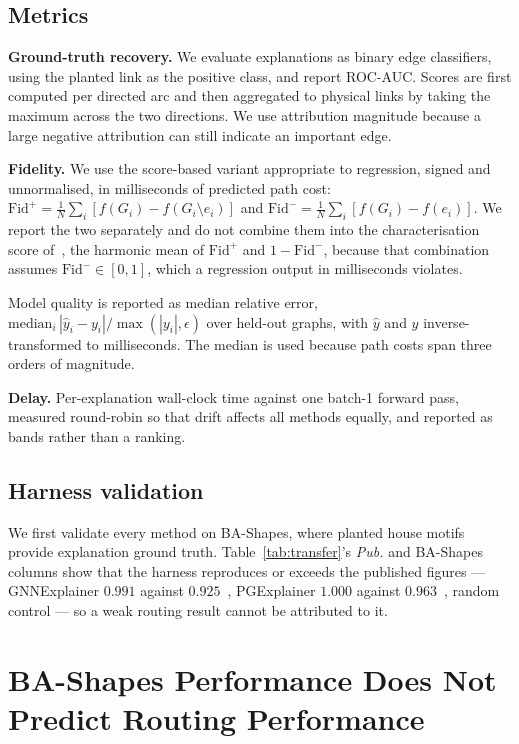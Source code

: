 \documentclass[conference]{IEEEtran}
\begin{document}
\subsection{Metrics}
\textbf{Ground-truth recovery.} We evaluate explanations as binary edge classifiers, using the planted link as the positive class, and report ROC-AUC. Scores are first computed per directed arc and then aggregated to physical links by taking the maximum across the two directions. We use attribution magnitude because a large negative attribution can still indicate an important edge.

\textbf{Fidelity.} We use the score-based variant appropriate to regression,
signed and unnormalised, in milliseconds of predicted path cost:
$\mathrm{Fid}^{+} = \frac{1}{N}\sum_i [f(G_i) - f(G_i \setminus e_i)]$ and
$\mathrm{Fid}^{-} = \frac{1}{N}\sum_i [f(G_i) - f(e_i)]$.
We report the two separately and do not combine them into the
characterisation score of~\cite{li2022survey}, the harmonic mean of
$\mathrm{Fid}^{+}$ and $1-\mathrm{Fid}^{-}$, because that combination assumes
$\mathrm{Fid}^{-}\!\in\![0,1]$, which a regression output in milliseconds
violates.

Model quality is reported as median relative error,
$\mathrm{median}_i\,|\hat{y}_i - y_i| / \max(|y_i|, \epsilon)$ over held-out
graphs, with $\hat{y}$ and $y$ inverse-transformed to milliseconds. The median
is used because path costs span three orders of magnitude.

\textbf{Delay.} Per-explanation wall-clock time against one batch-1 forward
pass, measured round-robin so that drift affects all methods equally, and
reported as bands rather than a ranking.

\subsection{Harness validation}
We first validate every method on BA-Shapes, where planted house motifs
provide explanation ground truth.
Table~\ref{tab:transfer}'s \emph{Pub.} and BA-Shapes columns show that the
harness reproduces or exceeds the published figures --- GNNExplainer $0.991$
against $0.925$~\cite{ying2019gnnexplainer}, PGExplainer $1.000$ against
$0.963$~\cite{luo2020pgexplainer}, random control \PhaseAControl{} --- so a
weak routing result cannot be attributed to it.

\section{BA-Shapes Performance Does Not Predict Routing Performance}
\label{sec:transfer}

\end{document}
